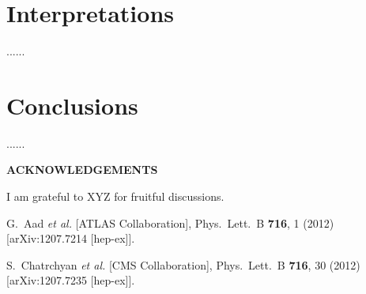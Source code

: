 \documentclass[10pt]{article}
\def\Acknowledgements{\bigskip  \bigskip \begin{center} \begin{large}
             \bf ACKNOWLEDGEMENTS \end{large}\end{center}}
\begin{document}
\section{Interpretations}

......

\section{Conclusions}

...... 

\Acknowledgements
I am grateful to XYZ for fruitful discussions.


\begin{thebibliography}{99}


  G.~Aad {\it et al.}  [ATLAS Collaboration],
  Phys.\ Lett.\ B {\bf 716}, 1 (2012)
  [arXiv:1207.7214 [hep-ex]].
  
  
  S.~Chatrchyan {\it et al.}  [CMS Collaboration],
  Phys.\ Lett.\ B {\bf 716}, 30 (2012)
  [arXiv:1207.7235 [hep-ex]].



\end{thebibliography}

 
\end{document}
